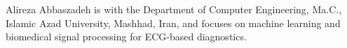 Alireza Abbaszadeh is with the Department of Computer Engineering, Ma.C., Islamic Azad University, Mashhad, Iran, and focuses on machine learning and biomedical signal processing for ECG-based diagnostics.
